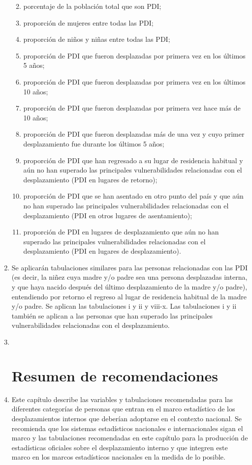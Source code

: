 \documentclass[
]{book}
\providecommand{\tightlist}{%
  \setlength{\itemsep}{0pt}\setlength{\parskip}{0pt}}
\begin{document}
\begin{enumerate}
  \begin{enumerate}
  \def\labelenumii{\arabic{enumii}.}
  \tightlist
  \item
    porcentaje de la población total que son PDI;
  \item
    proporción de mujeres entre todas las PDI;
  \item
    proporción de niños y niñas entre todas las PDI;
  \item
    proporción de PDI que fueron desplazadas por primera vez en los últimos 5 años;
  \item
    proporción de PDI que fueron desplazadas por primera vez en los últimos 10 años;
  \item
    proporción de PDI que fueron desplazadas por primera vez hace más de 10 años;
  \item
    proporción de PDI que fueron desplazadas más de una vez y cuyo primer desplazamiento fue durante los últimos 5 años;
  \item
    proporción de PDI que han regresado a su lugar de residencia habitual y aún no han superado las principales vulnerabilidades relacionadas con el desplazamiento (PDI en lugares de retorno);
  \item
    proporción de PDI que se han asentado en otro punto del país y que aún no han superado las principales vulnerabilidades relacionadas con el desplazamiento (PDI en otros lugares de asentamiento);
  \item
    proporción de PDI en lugares de desplazamiento que aún no han superado las principales vulnerabilidades relacionadas con el desplazamiento (PDI en lugares de desplazamiento).
  \end{enumerate}
\item
  Se aplicarán tabulaciones similares para las personas relacionadas con las PDI (es decir, la niñez cuya madre y/o padre sea una persona desplazadas interna, y que haya nacido después del último desplazamiento de la madre y/o padre), entendiendo por retorno el regreso al lugar de residencia habitual de la madre y/o padre. Se aplican las tabulaciones i y ii y viii-x. Las tabulaciones i y ii también se aplican a las personas que han superado las principales vulnerabilidades relacionadas con el desplazamiento.
\item ~
  \hypertarget{resumen-de-recomendaciones-2}{%
  \section{Resumen de recomendaciones}\label{resumen-de-recomendaciones-2}}
\item
  Este capítulo describe las variables y tabulaciones recomendadas para las diferentes categorías de personas que entran en el marco estadístico de los desplazamientos internos que deberían adoptarse en el contexto nacional. Se recomienda que los sistemas estadísticos nacionales e internacionales sigan el marco y las tabulaciones recomendadas en este capítulo para la producción de estadísticas oficiales sobre el desplazamiento interno y que integren este marco en los marcos estadísticos nacionales en la medida de lo posible.
\end{enumerate}
\end{document}
